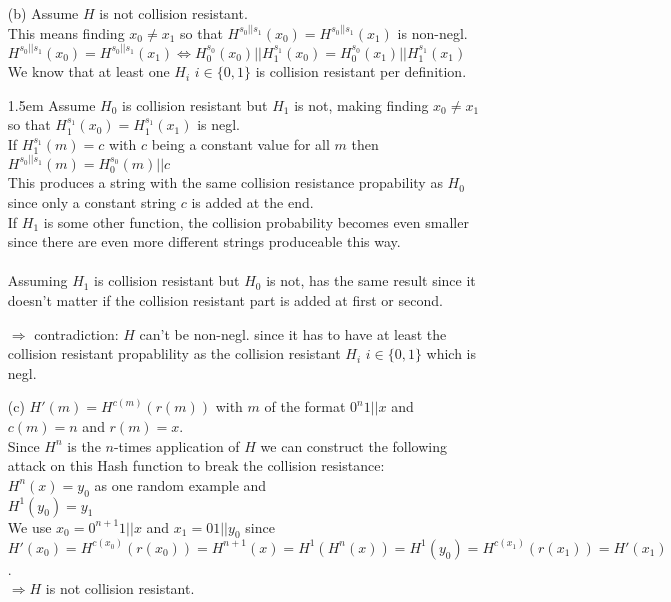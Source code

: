 \begin{itemize}
\item[(b)]
	Assume \(H\) is not collision resistant. \\
	This means finding \(x_0 \neq x_1\) so that \(H^{s_0 \vert\vert s_1}(x_0) = H^{s_0 \vert\vert s_1}(x_1)\) is non-negl. \\
	\(H^{s_0 \vert\vert s_1}(x_0) = H^{s_0 \vert\vert s_1}(x_1) \Leftrightarrow H^{s_0}_0(x_0) \vert\vert H^{s_1}_1(x_0) = H^{s_0}_0(x_1) \vert\vert H^{s_1}_1(x_1) \) \\
	We know that at least one \(H_i\) \(i \in \{0,1\}\) is collision resistant per definition. \\
	\par
	\begingroup
	\leftskip1.5em
	\rightskip\leftskip
		Assume \(H_0\) is collision resistant but \(H_1\) is not, making finding \(x_0 \neq x_1\) so that \(H^{s_1}_1(x_0) = H^{s_1}_1(x_1)\) is negl. \\
		If \(H^{s_1}_1(m) = c\) with \(c\) being a constant value for all \(m\) then \(H^{s_0 \vert\vert s_1}(m) = H^{s_0}_0(m) \vert\vert c\)\\
		This produces a string with the same collision resistance propability as \(H_0\) since only a constant string \(c\) is added at the end.\\
		If \(H_1\) is some other function, the collision probability becomes even smaller since there are even more different strings produceable this way.\\ 
		\\
		Assuming \(H_1\) is collision resistant but \(H_0\) is not, has the same result since it doesn't matter if the collision resistant part is added at first or 				second. \\
	\par
	\endgroup
	\(\Rightarrow\) contradiction: \(H\) can't be non-negl. since it has to have at least the collision resistant propablility as the collision resistant  \(H_i\) \(i \in \{0,1\}\) which is negl. \\

\item[(c)] 
	\(H'(m) = H^{c(m)}(r(m))\) with \(m\) of the format \(0^n1\vert\vert x\) and \(c(m) = n\) and \(r(m) = x\). \\
	Since \(H^n\) is the \(n\)-times application of \(H\) we can construct the following attack on this Hash function to break the collision resistance: \\
	\(H^{n}(x) = y_0\) as one random example and \\ 
	\(H^1(y_0) = y_1\) \\
	We use \(x_0 = 0^{n + 1}1 \vert\vert x\) and \(x_1 = 01 \vert\vert y_0\) since\\
	\(H'(x_0) = H^{c(x_0)}(r(x_0)) = H^{n+1}(x) = H^1(H^n (x)) = H^1(y_0) = H^{c(x_1)}(r(x_1)) = H'(x_1)\). \\
	\(\Rightarrow H\) is not collision resistant.\\
	
\end{itemize}  
  